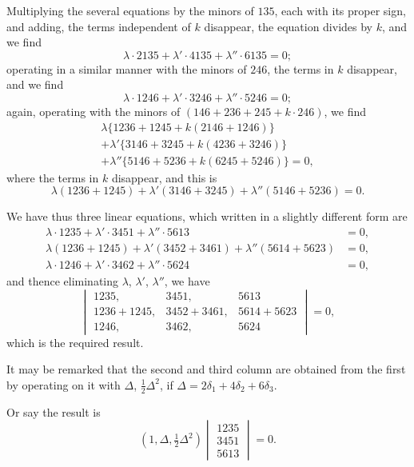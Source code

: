 \documentclass[11pt,a4paper]{article}
\theoremstyle{plain}
\begin{document}
Multiplying the several equations by the minors of $135$, each with its proper sign, and adding, the terms independent of $k$ disappear, the equation divides by $k$, and we find
\begin{equation}
\lambda\cdot 2135 + \lambda'\cdot 4135 + \lambda''\cdot 6135 = 0;
\end{equation}
operating in a similar manner with the minors of $246$, the terms in $k$ disappear, and we find
\begin{equation}
\lambda\cdot 1246 + \lambda'\cdot 3246 + \lambda''\cdot 5246 = 0;
\end{equation}
again, operating with the minors of $(146 + 236 + 245 + k\cdot 246)$, we find
\begin{multline}
\lambda\{1236 + 1245 + k(2146 + 1246)\} \\
+ \lambda'\{3146 + 3245 + k(4236 + 3246)\} \\
+ \lambda''\{5146 + 5236 + k(6245 + 5246)\} = 0,
\end{multline}
where the terms in $k$ disappear, and this is
\begin{equation}
\lambda(1236 + 1245) + \lambda'(3146 + 3245) + \lambda''(5146 + 5236) = 0.
\end{equation}

We have thus three linear equations, which written in a slightly different form are
\begin{align}
\lambda\cdot 1235 + \lambda'\cdot 3451 + \lambda''\cdot 5613 &= 0, \\
\lambda(1236 + 1245) + \lambda'(3452 + 3461) + \lambda''(5614 + 5623) &= 0, \\
\lambda\cdot 1246 + \lambda'\cdot 3462 + \lambda''\cdot 5624 &= 0,
\end{align}
and thence eliminating $\lambda$, $\lambda'$, $\lambda''$, we have
\begin{equation}
\begin{vmatrix}
1235, & 3451, & 5613 \\
1236+1245, & 3452+3461, & 5614+5623 \\
1246, & 3462, & 5624
\end{vmatrix} = 0,
\end{equation}
which is the required result.

It may be remarked that the second and third column are obtained from the first by operating on it with $\Delta$, $\tfrac{1}{2}\Delta^2$, if $\Delta = 2\delta_1 + 4\delta_2 + 6\delta_3$.

Or say the result is
\begin{equation}
(1, \Delta, \tfrac{1}{2}\Delta^2)
\begin{vmatrix}
1235 \\
3451 \\
5613
\end{vmatrix} = 0.
\end{equation}
\end{document}

